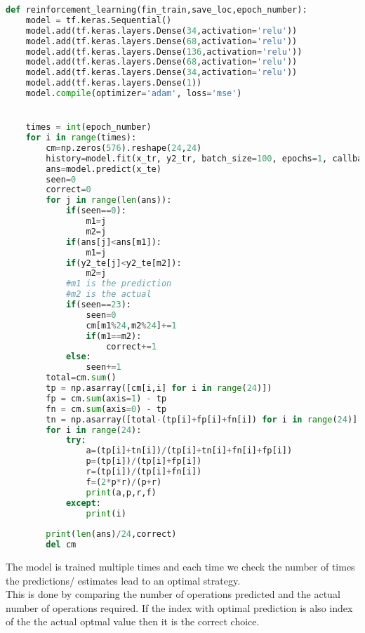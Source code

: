 \begin{lstlisting}[language=Python]
def reinforcement_learning(fin_train,save_loc,epoch_number):
    model = tf.keras.Sequential()
    model.add(tf.keras.layers.Dense(34,activation='relu'))
    model.add(tf.keras.layers.Dense(68,activation='relu'))
    model.add(tf.keras.layers.Dense(136,activation='relu'))
    model.add(tf.keras.layers.Dense(68,activation='relu'))
    model.add(tf.keras.layers.Dense(34,activation='relu'))
    model.add(tf.keras.layers.Dense(1))
    model.compile(optimizer='adam', loss='mse')


    times = int(epoch_number)
    for i in range(times):    
        cm=np.zeros(576).reshape(24,24)
        history=model.fit(x_tr, y2_tr, batch_size=100, epochs=1, callbacks=[cp_callback])
        ans=model.predict(x_te)
        seen=0
        correct=0
        for j in range(len(ans)):
            if(seen==0):
                m1=j
                m2=j
            if(ans[j]<ans[m1]):
                m1=j
            if(y2_te[j]<y2_te[m2]):
                m2=j
            #m1 is the prediction
            #m2 is the actual
            if(seen==23):
                seen=0
                cm[m1%24,m2%24]+=1
                if(m1==m2):
                    correct+=1
            else:
                seen+=1
        total=cm.sum()
        tp = np.asarray([cm[i,i] for i in range(24)])
        fp = cm.sum(axis=1) - tp
        fn = cm.sum(axis=0) - tp
        tn = np.asarray([total-(tp[i]+fp[i]+fn[i]) for i in range(24)]
        for i in range(24):
            try:
                a=(tp[i]+tn[i])/(tp[i]+tn[i]+fn[i]+fp[i])
                p=(tp[i])/(tp[i]+fp[i])
                r=(tp[i])/(tp[i]+fn[i])
                f=(2*p*r)/(p+r)
                print(a,p,r,f)
            except:
                print(i)   
        
        print(len(ans)/24,correct)
        del cm
\end{lstlisting}
The model is trained multiple times and each time we check the number of times the predictions/ estimates lead to an optimal strategy.\\
This is done by comparing the number of operations predicted and the actual number of operations required. If the index with optimal prediction is also index of the the actual optmal value then it is the correct choice.
